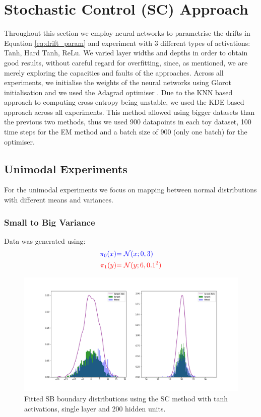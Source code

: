 \documentclass[a4paper,12pt,twoside,openright]{report}
\theoremstyle{definition}
\begin{document}
\section{Stochastic Control (SC)  Approach}


Throughout this section we employ neural networks \citep{lecun2015deep} to parametrise the drifts in Equation \ref{eq:drift_param} and experiment with 3 different types of activations: Tanh, Hard Tanh, ReLu.  We varied layer widths and depths in order to obtain good results, without careful regard for overfitting, since, as mentioned, we are merely exploring the capacities and faults of the approaches. Across all experiments, we initialise the weights of the neural networks using Glorot initialisation \citep{glorot2010understanding} and we used the Adagrad optimiser \citep{duchi2011adaptive}. Due to the KNN based approach to computing cross entropy being unstable, we used the KDE based approach across all experiments. This method allowed using bigger datasets than the previous two methods, thus we used 900 datapoints in each toy dataset, 100 time steps for the EM method and a batch size of 900 (only one batch) for the optimiser. 

\subsection{Unimodal Experiments}
For the unimodal experiments we focus on mapping between normal distributions with different means and variances.
\subsubsection{Small to Big Variance}

Data was generated using:
\begin{align*}
\color{blue}{\pi_0(x)} &\color{blue}{= {\mathcal{N}}(x; 0,  3)} \\
    \color{red}{\pi_1(y)} &\color{red}{= {\mathcal{N}}(y; 6, 0.1^2)} 
\end{align*}
\begin{figure}
    \centering
    \includegraphics[scale=0.4,trim={2.3cm 2cm 2cm 2cm}, clip]{images/Control/big_variance_tanh_marginals.png}
    \caption{ Fitted SB  boundary distributions using the SC method with tanh activations, single layer and 200 hidden units. }
    \label{fig:boundsbigvarnn}
\end{figure}
\end{document}
